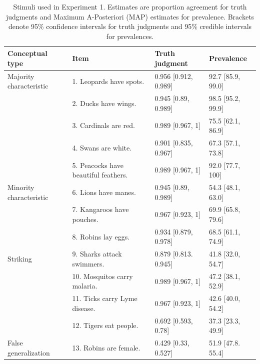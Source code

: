 \documentclass[10pt,letterpaper]{article}
\begin{document}
\begin{table}[h]
\centering

\caption{Stimuli used in Experiment 1. 
Estimates are proportion agreement for truth judgments and Maximum A-Posteriori (MAP) estimates for prevalence. 
Brackets denote 95\% confidence intervals for truth judgments and 95\% credible intervals for prevalences.}
\begin{tabular}{| l | l | p{3.5cm} | p{3.5cm} |}
\hline
Conceptual type & Item & Truth judgment & Prevalence \\
\hline \hline
Majority characteristic       & 1. Leopards have spots.    &0.956	[0.912, 0.989] & 92.7 [85.9, 99.0]\\
                                          & 2. Ducks have wings.                       &0.945	[0.89, 0.989] & 98.5 [95.2, 99.9]\\
                                          & 3. Cardinals are red.                       &0.989	[0.967, 1] & 75.5 [62.1, 86.9]\\
                                          & 4. Swans are white.                       &0.901	[0.835, 0.967] & 67.3 [57.1, 73.8] \\
                                          & 5. Peacocks have beautiful feathers. &  0.989	[0.967, 1] & 92.0 [77.7, 100] \\
Minority characteristic       & 6. Lions have manes.       &0.945	[0.89, 0.989] & 54.3 [48.1, 63.0]\\
                                          & 7. Kangaroos have pouches.                        &0.967 [0.923, 1]& 69.9 [65.8, 79.6]\\
                                          & 8. Robins lay eggs.                        &0.934	[0.879, 0.978]& 68.5 [61.1, 74.9]\\
Striking                      & 9. Sharks attack swimmers. &0.879	[0.813. 0.945] & 41.8 [32.0, 54.7]\\
                                  & 10. Mosquitos carry malaria.                        &0.989	[0.967, 1] & 47.2 [38.1,	 52.9]\\
                                  & 11. Ticks carry Lyme disease.                        &0.967	[0.923, 1] &  42.6 [40.0, 54.2]\\
                                  & 12. Tigers eat people.                        &0.692	[0.593, 0.78] & 37.3 [23.3, 49.9]\\
False generalization & 13. Robins are female.      &0.429	[0.33, 0.527] & 51.9 [47.8. 55.4]\\

\end{tabular}
\end{table}
\end{document}
